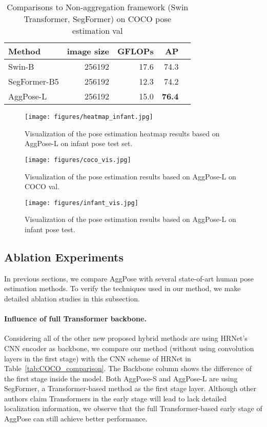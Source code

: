 \documentclass{article}
\begin{document}
\begin{table}
\centering
\begin{tabular}{lrrrr}
\toprule
Method  & image size & GFLOPs & AP \\
\midrule
Swin-B       & 256192  & 17.6  & 74.3      \\
SegFormer-B5 & 256192  & 12.3     & 74.2       \\
AggPose-L    & 256192  & 15.0     & \textbf{76.4}    \\
\bottomrule
\end{tabular}
\caption{Comparisons to Non-aggregation framework (Swin Transformer, SegFormer) on COCO pose estimation val}
\label{tab:abulation_comparison}
\end{table}

\begin{figure*}[h]
  \centering
  \texttt{[image: figures/heatmap\_infant.jpg]} 
  \caption{Visualization of the pose estimation heatmap results based on AggPose-L on infant pose test set.}
  \label{fig:heatmap_infant}
\end{figure*}


\begin{figure}[h]
  \centering
  \texttt{[image: figures/coco\_vis.jpg]} 
  \caption{Visualization of the pose estimation results based on AggPose-L on COCO val.}
  \label{fig:coco_vis}
\end{figure}


\begin{figure}[h]
  \centering
  \texttt{[image: figures/infant\_vis.jpg]} 
  \caption{Visualization of the pose estimation results based on AggPose-L on infant pose test.}
  \label{fig:infant_vis}
\end{figure}


\subsection{Ablation Experiments}

In previous sections, we compare AggPose with several state-of-art human pose estimation methods. To verify the techniques used in our method, we make detailed ablation studies in this subsection.

\paragraph{Influence of full Transformer backbone.} Considering all of the other new proposed hybrid methods are using HRNet's CNN encoder as backbone, we compare our method (without using convolution layers in the first stage) with the CNN scheme of HRNet in Table~\ref{tab:COCO_comparison}. The Backbone column shows the difference of the first stage inside the model. Both AggPose-S and AggPose-L are using SegFormer, a Transformer-based method as the first stage layer. Although other authors claim Transformers in the early stage will lead to lack detailed localization information, we observe that the full Transformer-based early stage of AggPose can still achieve better performance.
\end{document}
